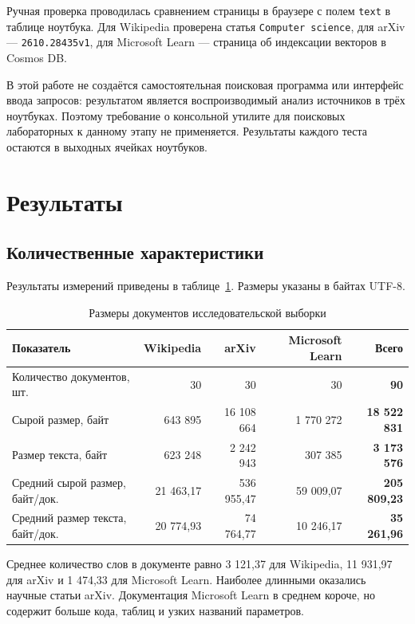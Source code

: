 \documentclass[pdf,unicode,12pt,a4paper,oneside,fleqn]{article}
\begin{document}
Ручная проверка проводилась сравнением страницы в браузере с полем \texttt{text}
в таблице ноутбука. Для Wikipedia проверена статья \texttt{Computer science},
для arXiv --- \texttt{2610.28435v1}, для Microsoft Learn --- страница об
индексации векторов в Cosmos DB.

В этой работе не создаётся самостоятельная поисковая программа или интерфейс
ввода запросов: результатом является воспроизводимый анализ источников в трёх
ноутбуках. Поэтому требование о консольной утилите для поисковых лабораторных к
данному этапу не применяется. Результаты каждого теста остаются в выходных
ячейках ноутбуков.

\pagebreak

\section{Результаты}

\subsection{Количественные характеристики}

Результаты измерений приведены в таблице~\ref{tab:statistics}. Размеры указаны в
байтах UTF-8.

\begin{table}[htbp]
\centering
\small
\caption{Размеры документов исследовательской выборки}
\label{tab:statistics}
\begin{tabular}{|p{}|r|r|r|r|}
\hline
\textbf{Показатель} & \textbf{Wikipedia} & \textbf{arXiv} &
\textbf{Microsoft Learn} & \textbf{Всего} \\
\hline
Количество документов, шт. & 30 & 30 & 30 & \textbf{90} \\
\hline
Сырой размер, байт & 643 895 & 16 108 664 & 1 770 272 &
\textbf{18 522 831} \\
\hline
Размер текста, байт & 623 248 & 2 242 943 & 307 385 &
\textbf{3 173 576} \\
\hline
Средний сырой размер, байт/док. & 21 463,17 & 536 955,47 & 59 009,07 &
\textbf{205 809,23} \\
\hline
Средний размер текста, байт/док. & 20 774,93 & 74 764,77 & 10 246,17 &
\textbf{35 261,96} \\
\hline
\end{tabular}
\end{table}

Среднее количество слов в документе равно 3 121,37 для Wikipedia, 11 931,97 для
arXiv и 1 474,33 для Microsoft Learn. Наиболее длинными оказались научные статьи
arXiv. Документация Microsoft Learn в среднем короче, но содержит больше кода,
таблиц и узких названий параметров.
\end{document}
